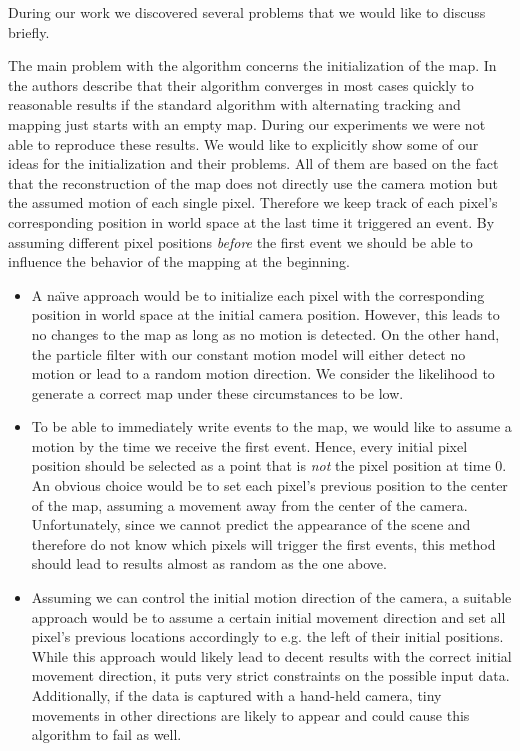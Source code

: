 During our work we discovered several problems that we would like to discuss briefly.

The main problem with the algorithm concerns the initialization of the map.
In \cite{kim2014simultaneous} the authors describe that their algorithm converges
in most cases quickly to reasonable results if the standard algorithm with
alternating tracking and mapping just starts with an empty map.
During our experiments we were not able to reproduce these results.
We would like to explicitly show some of our ideas for the initialization
and their problems. All of them are based on the fact that the reconstruction of the
map does not directly use the camera motion but the assumed motion of each
single pixel. Therefore we keep track of each pixel's corresponding position in world
space at the last time it triggered an event. By assuming different pixel positions
\textit{before} the first event we should be able to influence the behavior of the
mapping at the beginning.

\begin{itemize}
\item
A na\"{\i}ve approach would be to initialize each pixel with the corresponding position in
world space at the initial camera position. However, this leads to no changes to the map
as long as no motion is detected. On the other hand, the particle filter with our constant
motion model will either detect no motion or lead to a random motion direction. We consider
the likelihood to generate a correct map under these circumstances to be low.

\item
To be able to immediately write events to the map, we would like to assume a motion
by the time we receive the first event. Hence, every initial pixel position should be
selected as a point that is \textit{not} the pixel position at time 0.
An obvious choice would be to set each pixel's previous position to the center of the
map, assuming a movement away from the center of the camera.
Unfortunately, since we cannot predict the appearance of the scene and therefore do not
know which pixels will trigger the first events, this method should lead to results
almost as random as the one above.

\item
Assuming we can control the initial motion direction of the camera, a suitable approach
would be to assume a certain initial movement direction and set all pixel's previous locations
accordingly to e.g. the left of their initial positions.
While this approach would likely lead to decent results with the correct initial movement direction,
it puts very strict constraints on the possible input data. Additionally, if the data
is captured with a hand-held camera, tiny movements in other directions are likely to appear
and could cause this algorithm to fail as well.

\end{itemize}

